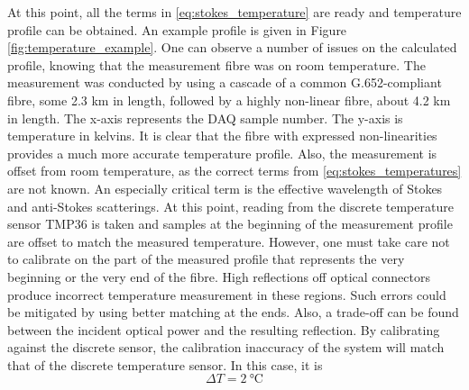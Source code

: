 \documentclass{standalone}
\begin{document}
At this point, all the terms in \ref{eq:stokes_temperature} are ready and temperature profile can be obtained. An example profile is given in Figure \ref{fig:temperature_example}.
One can observe a number of issues on the calculated profile, knowing that the measurement fibre was on room temperature. The measurement was conducted by using a cascade of a common G.652-compliant fibre, some 2.3 km in length, followed by a highly non-linear fibre, about 4.2 km in length. The x-axis represents the DAQ sample number. The y-axis is temperature in kelvins. It is clear that the fibre with expressed non-linearities provides a much more accurate temperature profile. Also, the measurement is offset from room temperature, as the correct terms from \ref{eq:stokes_temperatures} are not known. An especially critical term is the effective wavelength of Stokes and anti-Stokes scatterings. At this point, reading from the discrete temperature sensor TMP36 is taken and samples at the beginning of the measurement profile are offset to match the measured temperature. However, one must take care not to calibrate on the part of the measured profile that represents the very beginning or the very end of the fibre. High reflections off optical connectors produce incorrect temperature measurement in these regions. Such errors could be mitigated by using better matching at the ends. Also, a trade-off can be found between the incident optical power and the resulting reflection. By calibrating against the discrete sensor, the calibration inaccuracy of the system will match that of the discrete temperature sensor. In this case, it is \cite{datasheet:tmp36}
\begin{equation}
\varDelta T = \SI{2}{\celsius}
\end{equation}
\end{document}
